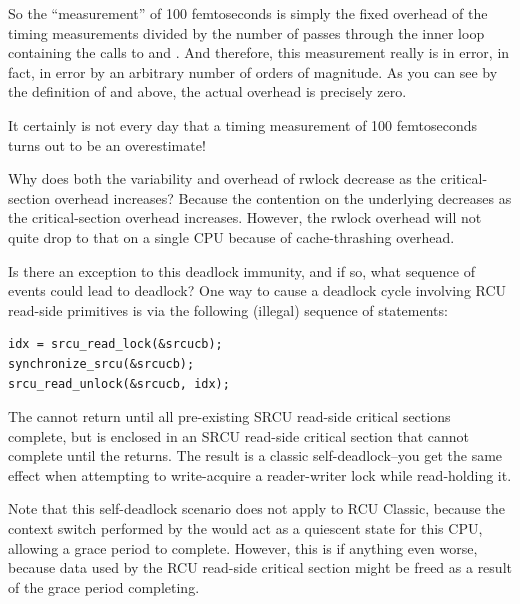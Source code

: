 	So the ``measurement'' of 100 femtoseconds is simply the fixed
	overhead of the timing measurements divided by the number of
	passes through the inner loop containing the calls
	to  and .
	And therefore, this measurement really is in error, in fact,
	in error by an arbitrary number of orders of magnitude.
	As you can see by the definition of 
	and  above, the actual overhead
	is precisely zero.

	It certainly is not every day that a timing measurement of
	100 femtoseconds turns out to be an overestimate!

\QuickQ{}
	Why does both the variability and overhead of rwlock decrease as the
	critical-section overhead increases?
\QuickA{}
	Because the contention on the underlying
	 decreases as the critical-section overhead
	increases.
	However, the rwlock overhead will not quite drop to that on a single
	CPU because of cache-thrashing overhead.

\QuickQ{}
	Is there an exception to this deadlock immunity, and if so,
	what sequence of events could lead to deadlock?
\QuickA{}
	One way to cause a deadlock cycle involving
	RCU read-side primitives is via the following (illegal) sequence
	of statements:

\vspace{5pt}
\begin{minipage}[t]{\columnwidth}
\small
\begin{verbatim}
idx = srcu_read_lock(&srcucb);
synchronize_srcu(&srcucb);
srcu_read_unlock(&srcucb, idx);
\end{verbatim}
\end{minipage}
\vspace{5pt}

	The  cannot return until all
	pre-existing SRCU read-side critical sections complete, but
	is enclosed in an SRCU read-side critical section that cannot
	complete until the  returns.
	The result is a classic self-deadlock--you get the same
	effect when attempting to write-acquire a reader-writer lock
	while read-holding it.

	Note that this self-deadlock scenario does not apply to
	RCU Classic, because the context switch performed by the
	 would act as a quiescent state
	for this CPU, allowing a grace period to complete.
	However, this is if anything even worse, because data used
	by the RCU read-side critical section might be freed as a
	result of the grace period completing.

